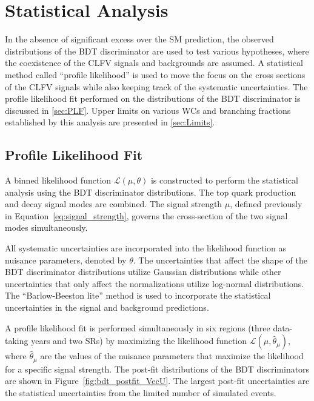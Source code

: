 \chapter{Statistical Analysis}
\label{chap:Results}

In the absence of significant excess over the \ac{SM} prediction, the observed distributions of the \ac{BDT} discriminator are used to test various hypotheses, where the coexistence of the \ac{CLFV} signals and backgrounds are assumed. A statistical method called ``profile likelihood'' is used to move the focus on the cross sections of the \ac{CLFV} signals while also keeping track of the systematic uncertainties. The profile likelihood fit performed on the distributions of the \ac{BDT} discriminator is discussed in \autoref{sec:PLF}. Upper limits on various \acp{WC} and branching fractions established by this analysis are presented in \autoref{sec:Limits}. 

\section{Profile Likelihood Fit}
\label{sec:PLF}

A binned likelihood function $\mathcal{L}(\mu, \theta)$ is constructed to perform the statistical analysis using the \ac{BDT} discriminator distributions. The top quark production and decay signal modes are combined. The signal strength $\mu$, defined previously in Equation~\ref{eq:signal_strength}, governs the cross-section of the two signal modes simultaneously. 

All systematic uncertainties are incorporated into the likelihood function as nuisance parameters, denoted by $\theta$. The uncertainties that affect the shape of the \ac{BDT} discriminator distributions utilize Gaussian distributions while other uncertainties that only affect the normalizations utilize log-normal distributions. The ``Barlow-Beeston lite'' method \cite{Barlow:1993dm} is used to incorporate the statistical uncertainties in the signal and background predictions. 

A profile likelihood fit is performed simultaneously in six regions (three data-taking years and two \acp{SR}) by maximizing the likelihood function $\mathcal{L}(\mu, \hat{\theta}_{\mu})$, where $\hat{\theta}_{\mu}$ are the values of the nuisance parameters that maximize the likelihood for a specific signal strength. The post-fit distributions of the \ac{BDT} discriminators are shown in Figure~\ref{fig:bdt_postfit_VecU}. The largest post-fit uncertainties are the statistical uncertainties from the limited number of simulated events.

